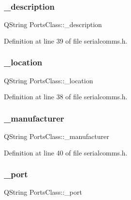 \subsubsection{\texorpdfstring{\_description}{\_description}}
{\footnotesize\ttfamily Q\+String Ports\+Class\+::\+\_\+description\hspace{0.3cm}{\ttfamily [private]}}



Definition at line 39 of file serialcomms.\+h.

\mbox{\label{class_ports_class_a09cafbfc55f5da779cb33d7ab9a5d963}} 
\subsubsection{\texorpdfstring{\_location}{\_location}}
{\footnotesize\ttfamily Q\+String Ports\+Class\+::\+\_\+location\hspace{0.3cm}{\ttfamily [private]}}



Definition at line 38 of file serialcomms.\+h.

\mbox{\label{class_ports_class_af8437a5a02dd31176ddc1fab5860c5fe}} 
\subsubsection{\texorpdfstring{\_manufacturer}{\_manufacturer}}
{\footnotesize\ttfamily Q\+String Ports\+Class\+::\+\_\+manufacturer\hspace{0.3cm}{\ttfamily [private]}}



Definition at line 40 of file serialcomms.\+h.

\mbox{\label{class_ports_class_a7b2aa52c2875846c58e565bed33df8cc}} 
\subsubsection{\texorpdfstring{\_port}{\_port}}
{\footnotesize\ttfamily Q\+String Ports\+Class\+::\+\_\+port\hspace{0.3cm}{\ttfamily [private]}}



